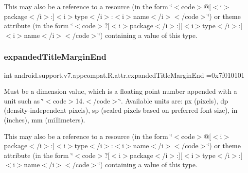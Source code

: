 This may also be a reference to a resource (in the form \char`\"{}$<$code$>$@\mbox{[}$<$i$>$package$<$/i$>$\+:\mbox{]}$<$i$>$type$<$/i$>$\+:$<$i$>$name$<$/i$>$$<$/code$>$\char`\"{}) or theme attribute (in the form \char`\"{}$<$code$>$?\mbox{[}$<$i$>$package$<$/i$>$\+:\mbox{]}\mbox{[}$<$i$>$type$<$/i$>$\+:\mbox{]}$<$i$>$name$<$/i$>$$<$/code$>$\char`\"{}) containing a value of this type. \mbox{\label{classandroid_1_1support_1_1v7_1_1appcompat_1_1R_1_1attr_a50689e9cb989e5597e509e70eb5f04e4}} 
\subsubsection{\texorpdfstring{expanded\+Title\+Margin\+End}{expandedTitleMarginEnd}}
{\footnotesize\ttfamily int android.\+support.\+v7.\+appcompat.\+R.\+attr.\+expanded\+Title\+Margin\+End =0x7f010101\hspace{0.3cm}{\ttfamily [static]}}

Must be a dimension value, which is a floating point number appended with a unit such as \char`\"{}$<$code$>$14.\+5sp$<$/code$>$\char`\"{}. Available units are\+: px (pixels), dp (density-\/independent pixels), sp (scaled pixels based on preferred font size), in (inches), mm (millimeters). 

This may also be a reference to a resource (in the form \char`\"{}$<$code$>$@\mbox{[}$<$i$>$package$<$/i$>$\+:\mbox{]}$<$i$>$type$<$/i$>$\+:$<$i$>$name$<$/i$>$$<$/code$>$\char`\"{}) or theme attribute (in the form \char`\"{}$<$code$>$?\mbox{[}$<$i$>$package$<$/i$>$\+:\mbox{]}\mbox{[}$<$i$>$type$<$/i$>$\+:\mbox{]}$<$i$>$name$<$/i$>$$<$/code$>$\char`\"{}) containing a value of this type. \mbox{\label{classandroid_1_1support_1_1v7_1_1appcompat_1_1R_1_1attr_a2d39a2245400f68ecb7cd82e84823f57}} 
